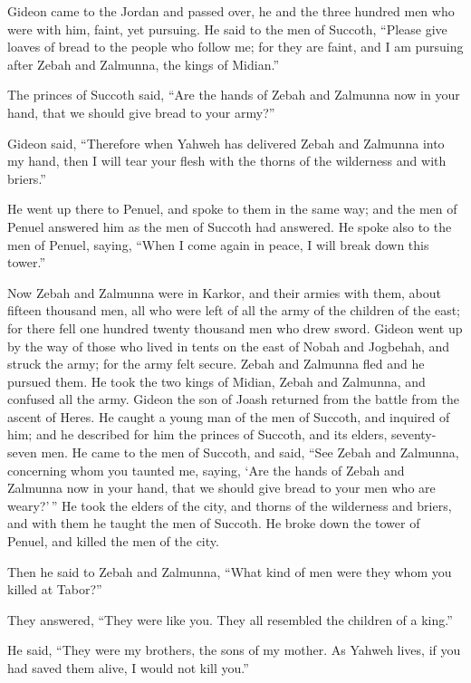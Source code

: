  Gideon came to the Jordan and passed over, he and the three
hundred men who were with him, faint, yet pursuing.  He said
to the men of Succoth, ``Please give loaves of bread to the people who
follow me; for they are faint, and I am pursuing after Zebah and
Zalmunna, the kings of Midian.''

 The princes of Succoth said, ``Are the hands of Zebah and
Zalmunna now in your hand, that we should give bread to your army?''

 Gideon said, ``Therefore when Yahweh has delivered Zebah
and Zalmunna into my hand, then I will tear your flesh with the thorns
of the wilderness and with briers.''

 He went up there to Penuel, and spoke to them in the same
way; and the men of Penuel answered him as the men of Succoth had
answered.  He spoke also to the men of Penuel, saying,
``When I come again in peace, I will break down this tower.''

 Now Zebah and Zalmunna were in Karkor, and their armies
with them, about fifteen thousand men, all who were left of all the army
of the children of the east; for there fell one hundred twenty thousand
men who drew sword.  Gideon went up by the way of those who
lived in tents on the east of Nobah and Jogbehah, and struck the army;
for the army felt secure.  Zebah and Zalmunna fled and he
pursued them. He took the two kings of Midian, Zebah and Zalmunna, and
confused all the army.  Gideon the son of Joash returned
from the battle from the ascent of Heres.  He caught a
young man of the men of Succoth, and inquired of him; and he described
for him the princes of Succoth, and its elders, seventy-seven men.
 He came to the men of Succoth, and said, ``See Zebah and
Zalmunna, concerning whom you taunted me, saying, `Are the hands of
Zebah and Zalmunna now in your hand, that we should give bread to your
men who are weary?'\,''  He took the elders of the city,
and thorns of the wilderness and briers, and with them he taught the men
of Succoth.  He broke down the tower of Penuel, and killed
the men of the city.

 Then he said to Zebah and Zalmunna, ``What kind of men
were they whom you killed at Tabor?''

They answered, ``They were like you. They all resembled the children of
a king.''

 He said, ``They were my brothers, the sons of my mother.
As Yahweh lives, if you had saved them alive, I would not kill you.''

